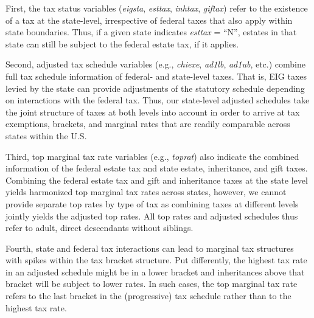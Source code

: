 \documentclass[
]{article}
\begin{document}
First, the tax status variables (\emph{eigsta}, \emph{esttax},
\emph{inhtax}, \emph{giftax}) refer to the existence of a tax at the
state-level, irrespective of federal taxes that also apply within state
boundaries. Thus, if a given state indicates \emph{esttax} = ``N'',
estates in that state can still be subject to the federal estate tax, if
it applies.

Second, adjusted tax schedule variables (e.g., \emph{chiexe},
\emph{ad1lb}, \emph{ad1ub}, etc.) combine full tax schedule information
of federal- and state-level taxes. That is, EIG taxes levied by the
state can provide adjustments of the statutory schedule depending on
interactions with the federal tax. Thus, our state-level adjusted
schedules take the joint structure of taxes at both levels into account
in order to arrive at tax exemptions, brackets, and marginal rates that
are readily comparable across states within the U.S.

Third, top marginal tax rate variables (e.g., \emph{toprat}) also
indicate the combined information of the federal estate tax and state
estate, inheritance, and gift taxes. Combining the federal estate tax
and gift and inheritance taxes at the state level yields harmonized top
marginal tax rates across states, however, we cannot provide separate
top rates by type of tax as combining taxes at different levels jointly
yields the adjusted top rates. All top rates and adjusted schedules thus
refer to adult, direct descendants without siblings.

Fourth, state and federal tax interactions can lead to marginal tax
structures with spikes within the tax bracket structure. Put
differently, the highest tax rate in an adjusted schedule might be in a
lower bracket and inheritances above that bracket will be subject to
lower rates. In such cases, the top marginal tax rate refers to the last
bracket in the (progressive) tax schedule rather than to the highest tax
rate.
\end{document}
